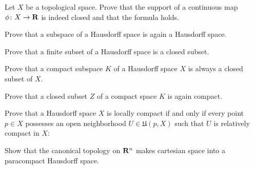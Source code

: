 \begin{xca}
  Let $X$ be a topological space. Prove that the support of a continuous map
  $\phi\colon X \to \mathbf{R}$ is indeed closed and that the formula 
  holds.
\end{xca}

\begin{xca}
  Prove that a subspace of a Hausdorff space is again a Hausdorff space.
\end{xca}

\begin{xca}
  Prove that a finite subset of a Hausdorff space is a closed subset.
\end{xca}

\begin{xca}
  Prove that a compact subspace $K$ of a Hausdorff space $X$ is always a closed subset
  of $X$.
\end{xca}

\begin{xca}
  Prove that a closed subset $Z$ of a compact space $K$ is again compact.
\end{xca}

\begin{xca}
  Prove that a Hausdorff space $X$ is locally compact if and only if every point
  $p \in X$ possesses an open neighborhood $U \in \mathfrak U(p, X)$ such that
  $U$ is relatively compact in $X$:
\end{xca}

\begin{xca}
  Show that the canonical topology on $\mathbf{R}^n$ makes cartesian space into
  a paracompact Hausdorff space.
\end{xca}

